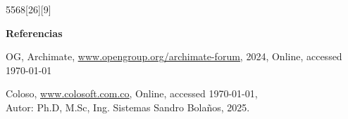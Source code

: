 \begin{NuevoParrafo}{55}{68}[26][9]
	\begin{Marco}[\LineaSupC][\LineaInfC][\LineaIzqC][\LineaDerC][CBlanco]
		{\centering\FuenteTitulos\Large\textbf{Referencias}\par}
		\vspace{4pt}

		\renewcommand{\bibfont}{\normalfont\small}
		\printbibliography[heading=none]

		\small
		\begin{enumerate}[label={[\arabic*]}, leftmargin=*, topsep=0pt, itemsep=4pt, parsep=0pt]
			\item OG, Archimate,
			{\color{CURL}\underline{\url{www.opengroup.org/archimate-forum}}},
			2024, Online, accessed \today
			\item Coloso,
			{\color{CURL}\underline{\url{www.colosoft.com.co}}},
			Online, accessed \today,\\
			Autor: Ph.D, M.Sc, Ing. Sistemas Sandro Bolaños, 2025.
		\end{enumerate}
	\end{Marco}
\end{NuevoParrafo}
